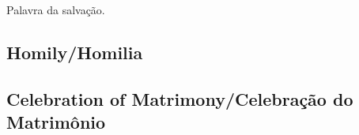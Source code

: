 \documentclass[10pt,a4]{article}
\begin{document}
\begin{paracol}{2}
Palavra da salva\c{c}\~ao.


 \switchcolumn*

\end{paracol}

\begin{center}
	\subsection*{Homily/Homilia}
	\subsection*{Celebration of Matrimony/Celebra\c{c}\~ao do Matrim\^onio}
\end{center}
\end{document}
